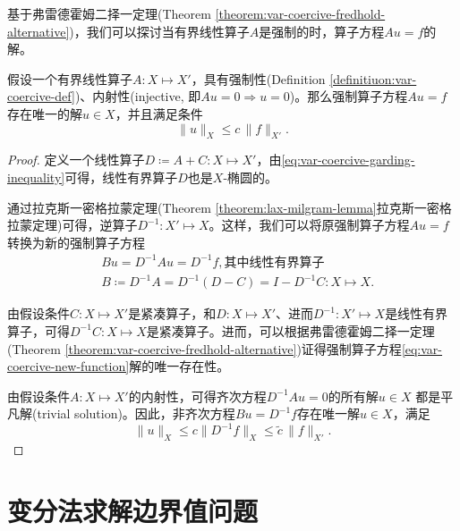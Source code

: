 基于弗雷德霍姆二择一定理(Theorem \ref{theorem:var-coercive-fredhold-alternative})，我们可以探讨当有界线性算子$A$是强制的时，算子方程$A u = f$的解。
\begin{theorem}[强制算子方程的解]
  假设一个有界线性算子$A: X \mapsto X'$，具有强制性(Definition \ref{definitiuon:var-coercive-def})、内射性(injective, 即$A u = 0 \Rightarrow u = 0$)。那么强制算子方程$A u = f$存在唯一的解$u \in X$，并且满足条件
  \begin{equation*}
    \big\| u \big\|_{X} \le c \, \big\| f \big\|_{X'}.
  \end{equation*}
\end{theorem}
\begin{proof}
  定义一个线性算子$D \coloneqq A + C: X \mapsto X'$，由\eqref{eq:var-coercive-garding-inequality}可得，线性有界算子$D$也是$X$-椭圆的。

  通过拉克斯一密格拉蒙定理(Theorem \ref{theorem:lax-milgram-lemma}拉克斯一密格拉蒙定理)可得，逆算子$D^{-1}: X' \mapsto X$。这样，我们可以将原强制算子方程$Au = f$转换为新的强制算子方程
  \begin{equation}
    \label{eq:var-coercive-new-function}
    \begin{split}
      &B u = D^{-1} A u = D^{-1} f, \text{其中线性有界算子}\\
      &B \coloneqq D^{-1} A = D^{-1} \left( D - C \right) = I - D^{-1} C: X \mapsto X.
    \end{split}
  \end{equation}

  由假设条件$C:X \mapsto X'$是紧凑算子，和$D:X \mapsto X'$、进而$D^{-1}:X' \mapsto X$是线性有界算子，可得$D^{-1} C:X \mapsto X$是紧凑算子。进而，可以根据弗雷德霍姆二择一定理(Theorem \ref{theorem:var-coercive-fredhold-alternative})证得强制算子方程\eqref{eq:var-coercive-new-function}解的唯一存在性。

  由假设条件$A:X \mapsto X'$的内射性，可得齐次方程$D^{-1} A u =0$的所有解$u \in X$ 都是平凡解(trivial solution)。因此，非齐次方程$B u = D^{-1} f$存在唯一解$u \in X$，满足
  \begin{equation*}
    \big\| u \big\|_{X} \le c \big\| D^{-1} f \big\|_{X} \le \tilde{c} \, \big\| f \big\|_{X'}.
  \end{equation*}
\end{proof}


\section{变分法求解边界值问题}
\label{sec:variational-bvp}

